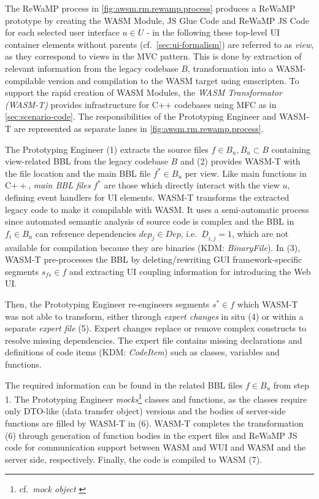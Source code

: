 The ReWaMP process \autocite{Heil2018ReWaMP} in \cref{fig:awsm.rm.rewamp.process} produces a ReWaMP prototype by creating the WASM Module, JS Glue Code and ReWaMP JS Code for each selected user interface \(u\in U\) - in the following these top-level UI container elements without parents (cf.~\cref{sec:ui-formalism}) are referred to as \emph{view}, as they correspond to views in the MVC pattern.
This is done by extraction of relevant information from the legacy codebase \(B\), transformation into a WASM-compilable version and compilation to the WASM target using emscripten.
To support the rapid creation of WASM Modules, the \emph{WASM Transformator (WASM-T)} provides infrastructure for C++ codebases using MFC as in \cref{sec:scenario-code}.
The responsibilities of the Prototyping Engineer and WASM-T are represented as separate lanes in \cref{fig:awsm.rm.rewamp.process}.

The Prototyping Engineer (1) extracts the source files \(f \in B_u, B_u \subset B\) containing view-related BBL from the legacy codebase \(B\) and (2) provides WASM-T with the file location and the main BBL file \(f^* \in B_u\) per view.
Like main functions in C\(++\), \emph{main BBL files} \(f^*\) are those which directly interact with the view \(u\), defining event handlers for UI elements.
WASM-T transforms the extracted legacy code to make it compilable with WASM.
It uses a semi-automatic process since automated semantic analysis of source code is complex and the BBL in \(f_i \in B_u\) can reference dependencies \(dep_j \in Dep\), i.e.~\(\underline D_{i,j} = 1\), which are not available for compilation because they are binaries (KDM: \emph{BinaryFile}).
In (3), WASM-T pre-processes the BBL by deleting/rewriting GUI framework-specific segments \(s_{fs} \in f \) and extracting UI coupling information for introducing the Web UI.

Then, the Prototyping Engineer re-engineers segments \(s^* \in f\) which WASM-T was not able to transform, either through \emph{expert changes} in situ (4) or within a separate \emph{expert file} (5).
Expert changes replace or remove complex constructs to resolve missing dependencies.
The expert file contains missing declarations and definitions of code items (KDM: \emph{CodeItem}) such as classes, variables and functions.

The required information can be found in the related BBL files \(f\in B_u\) from step 1.
The Prototyping Engineer \emph{mocks}\footnote{cf.~\emph{mock object} \autocite{ISO/IEEE24765Vocabulary}} classes and functions, as the classes require only DTO-like (data transfer object) versions and the bodies of server-side functions are filled by WASM-T in (6).
WASM-T completes the transformation (6) through generation of function bodies in the expert files and ReWaMP JS code for communication support between WASM and WUI and WASM and the server side, respectively.
Finally, the code is compiled to WASM (7).

